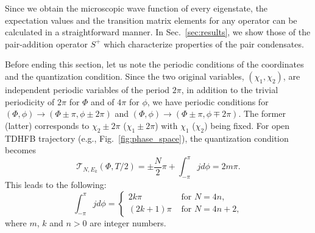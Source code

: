 \documentclass[%
superscriptaddress,
preprint,
showpacs,
nofootinbib,
amsmath,amssymb,
aps,
prc,
floatfix ]%
{revtex4-1}
\begin{document}
Since we obtain the microscopic wave function of every eigenstate,
the expectation values and the transition matrix elements for any operator
can be calculated in a straightforward manner.
In Sec.~\ref{sec:results}, we show those of the pair-addition operator
$S^+$ which characterize properties of the pair condensates.

%

Before ending this section, let us note the periodic conditions
of the coordinates and the quantization condition.
Since the two original variables, $(\chi_1,\chi_2)$,
are independent periodic variables of the period $2\pi$,
in addition to the trivial periodicity of $2\pi$ for $\Phi$ and of $4\pi$
for $\phi$,
we have periodic conditions for
$(\Phi,\phi)\rightarrow (\Phi\pm \pi,\phi\pm 2\pi)$ and
$(\Phi,\phi)\rightarrow (\Phi\pm \pi,\phi\mp 2\pi)$.
The former (latter) corresponds to $\chi_2\pm 2\pi$ ($\chi_1\pm 2\pi$)
with $\chi_1$ ($\chi_2$) being fixed.
For open TDHFB trajectory (e.g., Fig.~\ref{fig:phase_space}),
the quantization condition becomes
\begin{equation}
 \mathcal{T}_{N,E_k}(\Phi,T/2)
	= \pm \frac{N}{2} \pi + \int_{-\pi}^\pi j d\phi
	= 2m\pi .
\end{equation}
This leads to the following:
\begin{equation}
	\int_{-\pi}^\pi j d\phi = 
	\begin{cases}
		2k\pi & \mbox{ for } N=4n ,\\
		(2k+1)\pi & \mbox{ for } N=4n+2 ,
	\end{cases}
	\label{EBK_2}
\end{equation}
where $m$, $k$ and $n>0$ are integer numbers.
\end{document}
